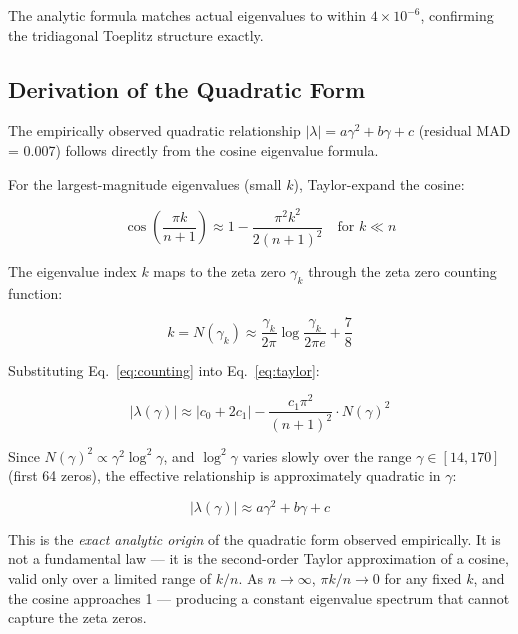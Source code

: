 \documentclass[11pt,a4paper]{article}
\begin{document}
The analytic formula matches actual eigenvalues to within $4 \times
10^{-6}$, confirming the tridiagonal Toeplitz structure exactly.

\subsection{Derivation of the Quadratic Form}
\label{sec:quadratic-derivation}

The empirically observed quadratic relationship $|\lambda| = a\gamma^2 +
b\gamma + c$ (residual MAD = 0.007) follows directly from the cosine
eigenvalue formula.

For the largest-magnitude eigenvalues (small $k$), Taylor-expand the
cosine:

\begin{equation}
\cos\left(\frac{\pi k}{n+1}\right) \approx 1 - \frac{\pi^2 k^2}{2(n+1)^2}
\quad \text{for } k \ll n
\label{eq:taylor}
\end{equation}

The eigenvalue index $k$ maps to the zeta zero $\gamma_k$ through the zeta
zero counting function:

\begin{equation}
k = N(\gamma_k) \approx \frac{\gamma_k}{2\pi}\log\frac{\gamma_k}{2\pi e}
+ \frac{7}{8}
\label{eq:counting}
\end{equation}

Substituting Eq.~\ref{eq:counting} into Eq.~\ref{eq:taylor}:

\begin{equation}
|\lambda(\gamma)| \approx \left|c_0 + 2c_1\right| -
\frac{c_1\pi^2}{(n+1)^2} \cdot N(\gamma)^2
\label{eq:analytic-g}
\end{equation}

Since $N(\gamma)^2 \propto \gamma^2 \log^2 \gamma$, and $\log^2 \gamma$
varies slowly over the range $\gamma \in [14, 170]$ (first 64 zeros), the
effective relationship is approximately quadratic in $\gamma$:

\begin{equation}
|\lambda(\gamma)| \approx a\gamma^2 + b\gamma + c
\label{eq:quadratic}
\end{equation}

This is the \emph{exact analytic origin} of the quadratic form observed
empirically. It is not a fundamental law --- it is the second-order Taylor
approximation of a cosine, valid only over a limited range of $k/n$. As
$n \to \infty$, $\pi k/n \to 0$ for any fixed $k$, and the cosine
approaches 1 --- producing a constant eigenvalue spectrum that cannot
capture the zeta zeros.
\end{document}
